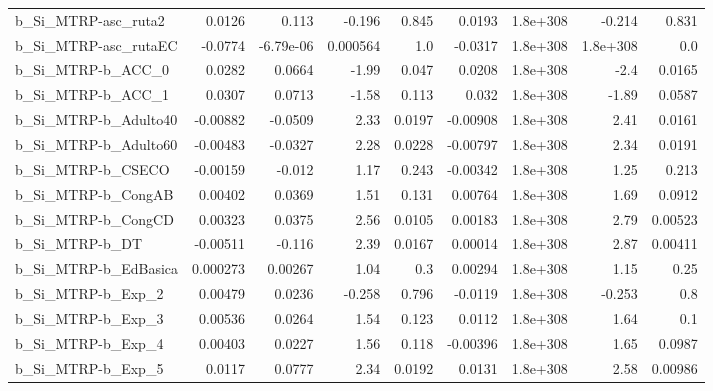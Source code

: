 \begin{tabular}{lrrrrrrrr}
b\_Si\_MTRP-asc\_ruta2          &      0.0126 &        0.113 &    -0.196 &    0.845 &     0.0193 &    1.8e+308 &       -0.214 &         0.831 \\
b\_Si\_MTRP-asc\_rutaEC         &     -0.0774 &    -6.79e-06 &  0.000564 &      1.0 &    -0.0317 &    1.8e+308 &     1.8e+308 &           0.0 \\
b\_Si\_MTRP-b\_ACC\_0            &      0.0282 &       0.0664 &     -1.99 &    0.047 &     0.0208 &    1.8e+308 &         -2.4 &        0.0165 \\
b\_Si\_MTRP-b\_ACC\_1            &      0.0307 &       0.0713 &     -1.58 &    0.113 &      0.032 &    1.8e+308 &        -1.89 &        0.0587 \\
b\_Si\_MTRP-b\_Adulto40         &    -0.00882 &      -0.0509 &      2.33 &   0.0197 &   -0.00908 &    1.8e+308 &         2.41 &        0.0161 \\
b\_Si\_MTRP-b\_Adulto60         &    -0.00483 &      -0.0327 &      2.28 &   0.0228 &   -0.00797 &    1.8e+308 &         2.34 &        0.0191 \\
b\_Si\_MTRP-b\_CSECO            &    -0.00159 &       -0.012 &      1.17 &    0.243 &   -0.00342 &    1.8e+308 &         1.25 &         0.213 \\
b\_Si\_MTRP-b\_CongAB           &     0.00402 &       0.0369 &      1.51 &    0.131 &    0.00764 &    1.8e+308 &         1.69 &        0.0912 \\
b\_Si\_MTRP-b\_CongCD           &     0.00323 &       0.0375 &      2.56 &   0.0105 &    0.00183 &    1.8e+308 &         2.79 &       0.00523 \\
b\_Si\_MTRP-b\_DT               &    -0.00511 &       -0.116 &      2.39 &   0.0167 &    0.00014 &    1.8e+308 &         2.87 &       0.00411 \\
b\_Si\_MTRP-b\_EdBasica         &    0.000273 &      0.00267 &      1.04 &      0.3 &    0.00294 &    1.8e+308 &         1.15 &          0.25 \\
b\_Si\_MTRP-b\_Exp\_2            &     0.00479 &       0.0236 &    -0.258 &    0.796 &    -0.0119 &    1.8e+308 &       -0.253 &           0.8 \\
b\_Si\_MTRP-b\_Exp\_3            &     0.00536 &       0.0264 &      1.54 &    0.123 &     0.0112 &    1.8e+308 &         1.64 &           0.1 \\
b\_Si\_MTRP-b\_Exp\_4            &     0.00403 &       0.0227 &      1.56 &    0.118 &   -0.00396 &    1.8e+308 &         1.65 &        0.0987 \\
b\_Si\_MTRP-b\_Exp\_5            &      0.0117 &       0.0777 &      2.34 &   0.0192 &     0.0131 &    1.8e+308 &         2.58 &       0.00986 \\

\end{tabular}
